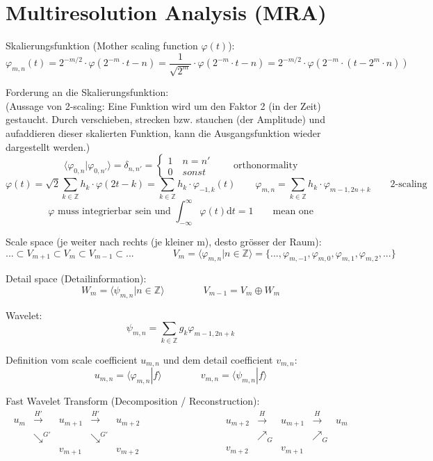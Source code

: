 \section{Multiresolution Analysis (MRA)}

Skalierungsfunktion (Mother scaling function $\varphi(t)$): 
\[
	\varphi_{m,n}(t)=2^{-m/2} \cdot \varphi(2^{-m}\cdot t - n) = \frac{1}{\sqrt{2^{m}}} \cdot \varphi(2^{-m}\cdot t -n) = 2^{-m/2} \cdot \varphi(2^{-m}\cdot (t - 2^{m}\cdot n))
\]

Forderung an die Skalierungsfunktion:\\
(Aussage von 2-scaling: Eine Funktion wird um den Faktor 2 (in der Zeit) gestaucht. Durch verschieben, strecken bzw. stauchen (der Amplitude) und aufaddieren dieser skalierten Funktion, kann die  Ausgangsfunktion wieder dargestellt werden.)
\[
	\langle \varphi_{0,n}|\varphi_{0,n'} \rangle = \delta_{n,n'} =  \begin{cases} 1 \quad n=n'\\ 0 \quad sonst  \end{cases}  \qquad \text{orthonormality} 
\]
\[
	\varphi(t) = \sqrt{2} \sum_{k \in \mathbb{Z}} h_k \cdot \varphi(2t-k) = \sum_{k \in \mathbb{Z}} h_k \cdot \varphi_{-1,k}(t) \qquad \varphi_{m,n}=\sum_{k \in \mathbb{Z}} h_k \cdot \varphi_{m-1,2n+k} \qquad \text{2-scaling}  
\]
\[
	\varphi \text{ muss integrierbar sein und } \int_{-\infty}^{\infty}\varphi(t) \mathrm{d}t = 1  \qquad \text{mean one}  
\] 


Scale space (je weiter nach rechts (je kleiner m), desto grösser der Raum): 
\[
	...\subset V_{m+1} \subset V_{m} \subset V_{m-1} \subset ...
	\qquad \qquad
	V_m = \langle \varphi_{m,n}|n \in \mathbb{Z}  \rangle = \{ ...,\varphi_{m,-1},\varphi_{m,0}, \varphi_{m,1}, \varphi_{m,2},... \}
\]

Detail space (Detailinformation):
\[
	W_m = \langle \psi_{m,n} | n \in \mathbb{Z} \rangle
	\qquad \qquad
	V_{m-1} = V_m \oplus W_m
\]

Wavelet:
\[
	\psi_{m,n} = \sum_{k \in \mathbb{Z}} g_k \varphi_{m-1,2n+k} 
\]

Definition vom scale coefficient $u_{m,n}$ und dem detail coefficient $v_{m,n}$:
\[
	u_{m,n} = \langle \varphi_{m,n}|f \rangle
	\qquad \qquad
	v_{m,n} = \langle \psi_{m,n}|f \rangle
\]

Fast Wavelet Transform (Decomposition / Reconstruction):
\[
	\boxed{\begin{array}{ccccc}
		u_m & \xrightarrow{H'} & u_{m+1} & \xrightarrow{H'} & u_{m+2} \\
		& \searrow^{G'} & & \searrow^{G'} & \\
		& & v_{m+1} & & v_{m+2} \\
	\end{array}}
	\qquad \qquad \qquad \qquad
	\boxed{\begin{array}{ccccc}
		u_{m+2} & \xrightarrow{H} & u_{m+1} & \xrightarrow{H} & u_{m} \\
		& \nearrow_G & & \nearrow_G & \\
		v_{m+2}& & v_{m+1} & & \\
	\end{array}}
\]

